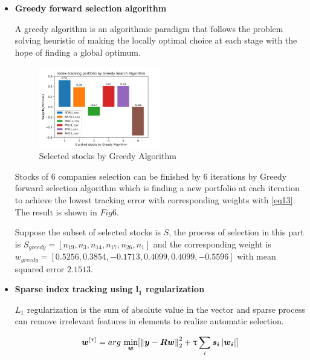 \documentclass[sigconf]{acmart}
\begin{document}
\begin{itemize}
\item \textbf{Greedy forward selection algorithm}

A greedy algorithm is an algorithmic paradigm that follows the problem solving heuristic of making the locally optimal choice at each stage with the hope of finding a global optimum\cite{gutin2001introduction}.

\begin{figure}[htbp]
    \centering
    \includegraphics[width=0.5\textwidth]{8.png}
    \caption{\label{}Selected stocks by Greedy Algorithm}
\end{figure}

Stocks of 6 companies selection can be finished by 6 iterations by Greedy forward selection algorithm which is finding a new portfolio at each iteration to achieve the lowest tracking error with corresponding weights with \eqref{eq13}. The result is shown in $Fig6$.

Suppose the subset of selected stocks is $S$, the process of selection in this part is $S_{greedy}=[n_{19},n_{3},n_{14},n_{17},n_{26},n_{1}]$ and the corresponding weight is \\$w_{greedy}=[0.5256,0.3854,-0.1713,0.4099,0.4099,-0.5596]$ with mean squared error $2.1513$. ~\\


\item \textbf{Sparse index tracking using $\bm{l_{1}}$ regularization}

$L_{1}$ regularization is the sum of absolute value in the vector and sparse process can remove irrelevant features in elements to realize automatic selection. 

\begin{equation} \label{eq14}
\setlength{\abovedisplayskip}{3pt}
\setlength{\belowdisplayskip}{3pt}
\bm{w}^{[\uptau]}=arg\,\min\limits_{\bm{w}}[\left \| \bm{y}-\bm{Rw} \right \|_{2}^{2}+\uptau \sum_{i} \bm{s_{i}} \left |\bm{w_{i}}  \right |]
\end{equation}


\end{itemize}
\end{document}
